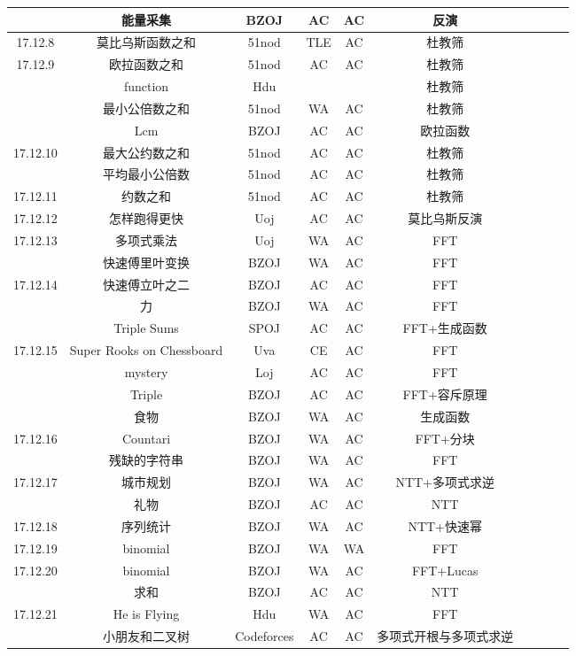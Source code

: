 \documentclass[landscape]{article}
\begin{document}
\begin{longtable}{cccccccccc}
  & 能量采集 & BZOJ & AC & AC & 反演\\
  \hline
  17.12.8 & 莫比乌斯函数之和 & 51nod & TLE & AC & 杜教筛\\
  \hline
  17.12.9 & 欧拉函数之和 & 51nod & AC & AC & 杜教筛\\
  & function & Hdu &  &  & 杜教筛\\
  & 最小公倍数之和 & 51nod & WA & AC & 杜教筛\\
  & Lcm & BZOJ & AC & AC & 欧拉函数\\
  \hline
  17.12.10 & 最大公约数之和 & 51nod & AC & AC & 杜教筛\\
  & 平均最小公倍数 & 51nod & AC & AC & 杜教筛\\
  \hline
  17.12.11 & 约数之和 & 51nod & AC & AC & 杜教筛 \\
  \hline
  17.12.12 & 怎样跑得更快 & Uoj & AC & AC & 莫比乌斯反演\\
  \hline
  17.12.13 & 多项式乘法 & Uoj & WA & AC & FFT\\
  & 快速傅里叶变换 & BZOJ & WA & AC & FFT\\
  \hline
  17.12.14 & 快速傅立叶之二 & BZOJ & AC & AC & FFT\\
  & 力 & BZOJ & WA & AC & FFT\\
  & Triple Sums & SPOJ & AC & AC & FFT+生成函数\\
  \hline
  17.12.15 & Super Rooks on Chessboard & Uva & CE & AC & FFT\\
  & mystery & Loj & AC & AC & FFT\\
  & Triple & BZOJ & AC & AC & FFT+容斥原理\\
  & 食物 & BZOJ & WA & AC & 生成函数\\
  \hline
  17.12.16 & Countari & BZOJ & WA & AC & FFT+分块\\
  & 残缺的字符串 & BZOJ & WA & AC & FFT\\
  \hline
  17.12.17 & 城市规划 & BZOJ & WA & AC & NTT+多项式求逆\\
  & 礼物 & BZOJ & AC & AC & NTT\\
  \hline
  17.12.18 & 序列统计 & BZOJ & WA & AC & NTT+快速幂\\
  \hline
  17.12.19 & binomial & BZOJ & WA & WA & FFT\\
  \hline
  17.12.20 & binomial & BZOJ & WA & AC & FFT+Lucas\\
  & 求和 & BZOJ & AC & AC & NTT\\
  \hline
  17.12.21 & He is Flying & Hdu & WA & AC & FFT\\
  & 小朋友和二叉树 & Codeforces & AC & AC & 多项式开根与多项式求逆\\

\end{longtable}
\end{document}
